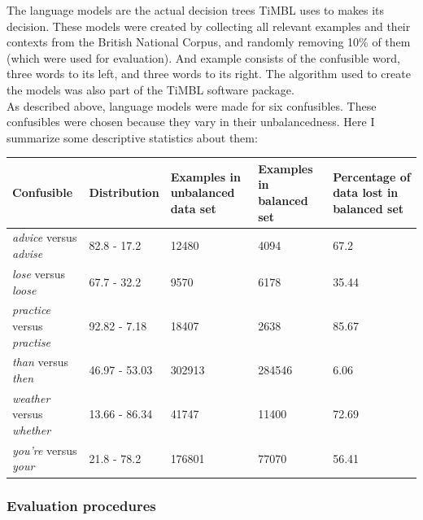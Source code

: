 \documentclass[12pt]{article}
\begin{document}
The language models are the actual decision trees TiMBL uses to makes its decision. These models were created by collecting all relevant examples and their contexts from the British National Corpus, and randomly removing 10\% of them (which were used for evaluation). And example consists of the confusible word, three words to its left, and three words to its right. The algorithm used to create the models was also part of the TiMBL software package.\\\indent
As described above, language models were made for six confusibles. These confusibles were chosen because they vary in their unbalancedness. Here I summarize some descriptive statistics about them:

\begin{table}[h] \footnotesize
\begin{tabular}{|l|l|p{3cm}|l|p{3cm}|}
\hline
Confusible&Distribution&Examples in unbalanced data set&Examples in balanced set&Percentage of data lost in balanced set\\
\hline
\emph{advice} versus \emph{advise}&82.8 - 17.2&12480&4094&67.2\\
\emph{lose} versus \emph{loose}&67.7 - 32.2&9570&6178&35.44\\
\emph{practice} versus \emph{practise}&92.82 - 7.18&18407&2638&85.67\\
\emph{than} versus \emph{then}&46.97 - 53.03&302913&284546&6.06\\
\emph{weather} versus \emph{whether}&13.66 - 86.34&41747&11400&72.69\\
\emph{you're} versus \emph{your}&21.8 - 78.2&176801&77070&56.41\\
\hline
\end{tabular}
\end{table}

\subsubsection{Evaluation procedures} \label{eval}
\end{document}
